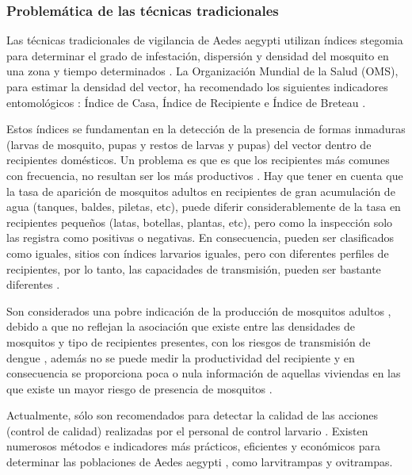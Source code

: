 \subsubsection{Problemática de las técnicas tradicionales}
Las técnicas tradicionales de vigilancia de Aedes aegypti utilizan índices stegomia para
determinar el grado de infestación, dispersión y densidad del mosquito en una zona y tiempo
determinados \cite{NINO2011}. La Organización Mundial de la Salud (OMS), para estimar la densidad
del vector, ha recomendado los siguientes indicadores entomológicos : Índice de Casa, Índice de
Recipiente e Índice de Breteau \cite{cenaprece2013}.

Estos índices se fundamentan en la detección de la presencia de formas inmaduras (larvas de
mosquito, pupas y restos de larvas y pupas) del vector dentro de recipientes domésticos. Un
problema es que es que los recipientes más comunes con frecuencia, no resultan ser los más
productivos \cite{world2009dengue}. Hay que tener en cuenta que la tasa de aparición de mosquitos
adultos en recipientes de gran acumulación de agua (tanques, baldes, piletas, etc), puede diferir
considerablemente de la tasa en recipientes pequeños (latas, botellas, plantas, etc), pero como
la inspección solo las registra como positivas o negativas. En consecuencia, pueden ser
clasificados como iguales, sitios con índices larvarios iguales, pero con diferentes perfiles de
recipientes, por lo tanto, las capacidades de transmisión, pueden ser bastante diferentes
\cite{world2009dengue}.

Son considerados una pobre indicación de la producción de mosquitos adultos
\cite{world2009dengue, cenaprece2013}, debido a que no reflejan la asociación que existe entre las
densidades de mosquitos y tipo de recipientes presentes, con los riesgos de transmisión de dengue
\cite{cenaprece2013}, además no se puede medir la productividad del recipiente
\cite{world2009dengue} y en consecuencia se proporciona poca o nula información de aquellas
viviendas en las que existe un mayor riesgo de presencia de mosquitos \cite{cenaprece2013}.

Actualmente, sólo son recomendados para detectar la calidad de las acciones (control de calidad)
realizadas por el personal de control larvario \cite{cenaprece2013}. Existen numerosos métodos e
indicadores más prácticos, eficientes y económicos para determinar las poblaciones de Aedes
aegypti \cite{cenaprece2013}, como larvitrampas y ovitrampas.
